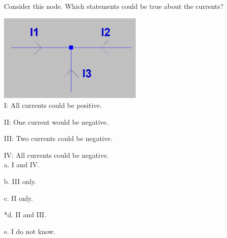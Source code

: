 
Consider this node. Which statements could be true about the currents?

\includegraphics[width=2.78125in,height=1.68561in]{../../Images/KirchhoffsLawsQ4.png}\\

I: All currents could be positive.

II: One current would be negative.

III: Two currents could be negative.

IV: All currents could be negative.\\

a. I and IV.

b. III only.

c. II only.

*d. II and III.

e. I do not know.\\
